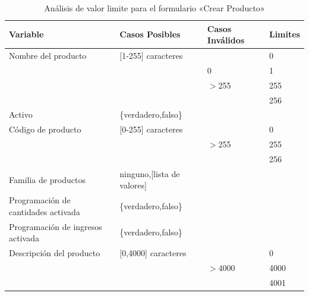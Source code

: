 \begin{table}
\centering
\begin{tabular}{|p{6.0cm}|l|l|l|}
\hline
\footnotesize{\textbf{Variable}} & \footnotesize{\textbf{Casos Posibles}} & \footnotesize{\textbf{Casos Inválidos}} & \footnotesize{\textbf{Limites}} \\
\hline
\footnotesize{Nombre del producto} & \footnotesize{[1-255] caracteres} & & \footnotesize{0} \\
& & \footnotesize{0} & \footnotesize{1} \\
& & \footnotesize{$>$255} & \footnotesize{255} \\
& & & \footnotesize{256} \\
\hline
\footnotesize{Activo} & \footnotesize{\{verdadero,falso\}} & & \\
\hline
\footnotesize{Código de producto} & \footnotesize{[0-255] caracteres} & & \footnotesize{0} \\
& & \footnotesize{$>$255} & \footnotesize{255} \\
& & & \footnotesize{256} \\
\hline
\footnotesize{Familia de productos} & \footnotesize{ninguno,[lista de valores]} & & \\
\hline
\footnotesize{Programación de cantidades activada} & \footnotesize{\{verdadero,falso\}} & & \\
\hline
\footnotesize{Programación de ingresos activada} & \footnotesize{\{verdadero,falso\}} & & \\
\hline
\footnotesize{Descripción del producto} & \footnotesize{[0,4000] caracteres} & & \footnotesize{0} \\
& & \footnotesize{$>$4000} & \footnotesize{4000} \\
& & & \footnotesize{4001} \\
\hline
\end{tabular}
\caption{Análisis de valor limite para el formulario «Crear Producto»}
\label{myers_01}
\end{table}

